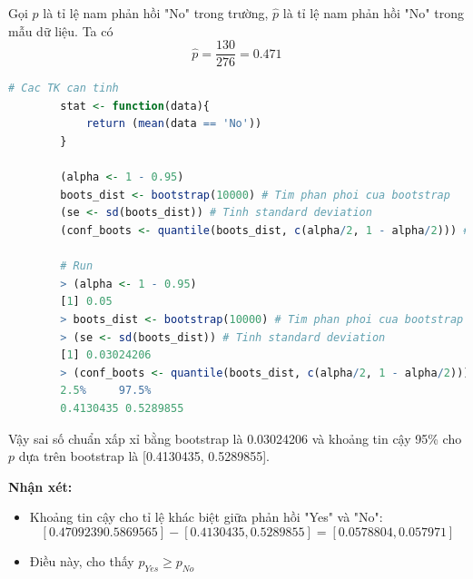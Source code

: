 \documentclass[a4paper,12pt]{article}
\begin{document}
\begin{enumerate}[label=\alph*)]
		Gọi $p$ là tỉ lệ nam phản hồi "No" trong trường, $\hat{p}$ là tỉ lệ nam phản hồi "No" trong mẫu dữ liệu. Ta có
		$$\hat{p} = \frac{130}{276} = 0.471$$
		\begin{lstlisting}[language = R]
		# Cac TK can tinh
		stat <- function(data){
			return (mean(data == 'No'))
		}
		
		(alpha <- 1 - 0.95)
		boots_dist <- bootstrap(10000) # Tim phan phoi cua bootstrap
		(se <- sd(boots_dist)) # Tinh standard deviation
		(conf_boots <- quantile(boots_dist, c(alpha/2, 1 - alpha/2))) # Tim khoang tin cay cho p
		
		# Run
		> (alpha <- 1 - 0.95)
		[1] 0.05
		> boots_dist <- bootstrap(10000) # Tim phan phoi cua bootstrap
		> (se <- sd(boots_dist)) # Tinh standard deviation
		[1] 0.03024206
		> (conf_boots <- quantile(boots_dist, c(alpha/2, 1 - alpha/2))) # Tim khoang tin cay cho p
		2.5%     97.5% 
		0.4130435 0.5289855
		\end{lstlisting}
		
		Vậy sai số chuẩn xấp xỉ bằng bootstrap là 0.03024206 và khoảng tin cậy 95\% cho $p$ dựa trên bootstrap là [0.4130435, 0.5289855].
		
	\end{enumerate}
	\textbf{Nhận xét:}\\
	\begin{itemize}
	\item Khoảng tin cậy cho tỉ lệ khác biệt giữa phản hồi "Yes" và "No":
	$$[0.4709239 0.5869565] - [0.4130435, 0.5289855] = [0.0578804, 0.057971]$$
	\item Điều này, cho thấy $p_{Yes} \geq p_{No}$
	\end{itemize}
\end{document}
